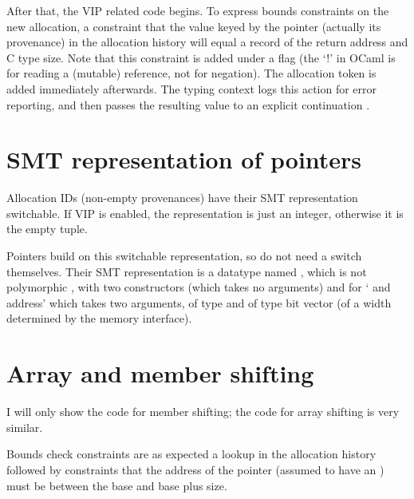 
After that, the VIP related code begins. To express bounds constraints on the
new allocation, a constraint that the value keyed by the pointer (actually its
provenance) in the allocation history will equal a record of the return address
and C type size. Note that this constraint is added under a flag
 (the `!' in OCaml is for reading a (mutable) reference,
not for negation). The allocation token is added immediately afterwards. The
typing context logs this action for error reporting, and then passes the
resulting value to an explicit continuation .


\section{SMT representation of pointers}

Allocation IDs (non-empty provenances) have their SMT representation
switchable. If VIP is enabled, the representation is just an integer, otherwise
it is the empty tuple.


Pointers build on this switchable representation, so do not need a switch
themselves. Their SMT representation is a datatype named
, which is not polymorphic \ocamlinline{[]}, with two %
constructors  (which takes no arguments) and
 for ` and address' which takes two arguments,
 of type  and %
 of type bit vector (of a width determined by the memory %
interface).


\section{Array and member shifting}

I will only show the code for member shifting; the code for array shifting is
very similar.

Bounds check constraints are as expected \textemdash{} a lookup in the
allocation history followed by constraints that the address of the pointer
(assumed to have an ) must be between the base and base plus
size.


